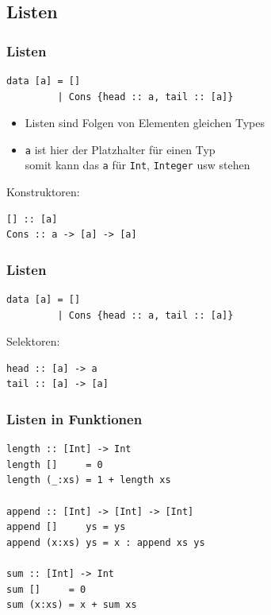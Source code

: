 \subsection{Listen}
\begin{frame}[fragile]
\frametitle{Listen}
\begin{lstlisting}
data [a] = []
         | Cons {head :: a, tail :: [a]}
\end{lstlisting}
\begin{block}{\vspace*{-3ex}}
\begin{itemize}
  \item Listen sind Folgen von Elementen gleichen Types
  \item \lstinline|a| ist hier der Platzhalter für einen Typ\\
  		somit kann das \lstinline|a| für \lstinline|Int|, \lstinline|Integer| usw stehen
\end{itemize}
\end{block}  		
Konstruktoren: 
\pause
\begin{lstlisting}
[] :: [a]
Cons :: a -> [a] -> [a]
\end{lstlisting}
\end{frame}

\begin{frame}[fragile]
\frametitle{Listen}
\begin{lstlisting}
data [a] = []
         | Cons {head :: a, tail :: [a]}
\end{lstlisting}
Selektoren: 
\pause
\begin{lstlisting}
head :: [a] -> a
tail :: [a] -> [a]
\end{lstlisting}
\end{frame}

\begin{frame}[fragile]
\frametitle{Listen in Funktionen}
\begin{lstlisting}
length :: [Int] -> Int
length []     = 0
length (_:xs) = 1 + length xs

append :: [Int] -> [Int] -> [Int]
append []     ys = ys
append (x:xs) ys = x : append xs ys

sum :: [Int] -> Int
sum []     = 0
sum (x:xs) = x + sum xs
\end{lstlisting}
\end{frame}

